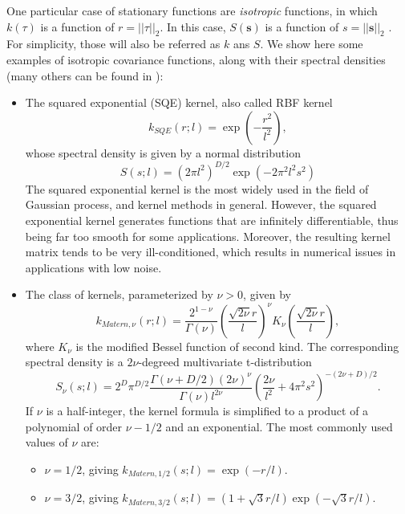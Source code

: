 One particular case of stationary functions are \textit{isotropic} functions, in which $k(\tau)$ is a function of $r = ||\tau||_2$. In this case, $S(\mathbf{s})$ is a function of $s = ||\mathbf{s}||_2$ \cite{CIS-4647}. For simplicity, those will also be referred as $k$ ans $S$. We show here some examples of isotropic covariance functions, along with their spectral densities (many others can be found in \cite{Rasmussen06}):
\begin{itemize}
	\item The squared exponential (SQE) kernel, also called RBF kernel 
	\begin{equation}\label{sqekernel}
	k_{SQE}(r;l) = \exp \left(-\frac{r^2}{l^2}\right),
	\end{equation}
	whose spectral density is given by a normal distribution
	\begin{equation}
	S(s;l) = (2 \pi l^2)^{D/2} \exp(-2 \pi^2 l^2 s^2)
	\end{equation}
	The squared exponential kernel is the most widely used in the field of Gaussian process, and kernel methods in general. However, the squared exponential kernel generates functions that are infinitely differentiable, thus being far too smooth for some applications. Moreover, the resulting kernel matrix tends to be very ill-conditioned, which results in numerical issues in applications with low noise.
	\item The  class of kernels, parameterized by $\nu > 0$, given by
	\begin{equation}\label{maternkernel}
	k_{Matern,\nu}(r;l) = \frac{2^{1-\nu}}{\Gamma(\nu)} \left(\frac{\sqrt{2 \nu} r}{l} \right)^\nu
	K_\nu \left( \frac{\sqrt{2 \nu} r}{l} \right),
	\end{equation}
	where $K_\nu$ is the modified Bessel function of second kind. The corresponding spectral density 
	is a $2 \nu$-degreed multivariate t-distribution
	\begin{equation}
	S_\nu(s;l) = 2^D \pi^{D/2} \frac{\Gamma(\nu + D/2)(2 \nu)^\nu}{\Gamma(\nu)l^{2 \nu}}\left(\frac{2 \nu}{l^2} + 
	4 \pi^2 s^2\right)^{-(2 \nu+D)/2}.
	\end{equation}
	If $\nu$ is a half-integer, the kernel formula is simplified to a product of a polynomial of order $\nu - 1/2$ and an exponential. The most commonly used values of $\nu$ are:
	\begin{itemize}
		\item $\nu = 1/2$, giving $k_{Matern,1/2}(s;l) = \exp(-r/l)$.
		\item $\nu = 3/2$, giving $k_{Matern,3/2}(s;l) = \left(1 + \sqrt{3} r/l \right) \exp(-\sqrt{3}r/l)$.

\end{itemize}
\end{itemize}
